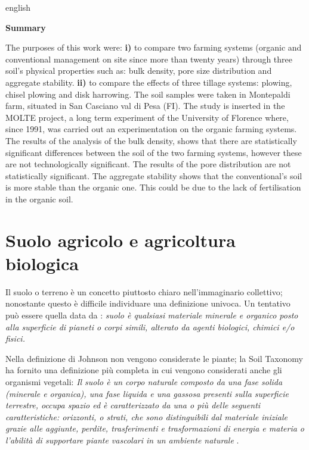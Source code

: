 \documentclass[11pt, a4paper, openright, titlepage, final, language = italian]{book}
\newenvironment{engabstract}%
{\cleardoublepage\null \vfill\begin{center}%
    \bfseries Summary  \end{center} \footnotesize}%
{\vfill\null}
\begin{document}
\begin{otherlanguage*}{english}
\begin{engabstract}
  The purposes of this work were: \textbf{i)} to compare two farming
  systems (organic and conventional management on site since more than
  twenty years) through three soil's physical properties such as: bulk
  density, pore size distribution and aggregate stability.
  \textbf{ii)} to compare the effects of three tillage systems:
  plowing, chisel plowing and disk harrowing. The soil samples were
  taken in Montepaldi farm, situated in San Casciano val di Pesa
  (FI). The study is inserted in the MOLTE project, a long term
  experiment of the University of Florence where, since 1991, was
  carried out an experimentation on the organic farming systems.
  The results of the analysis of the bulk density, shows that there are
  statistically significant differences between the soil of the two
  farming systems, however these are not technologically significant. The
  results of the pore distribution are not statistically
  significant. The aggregate stability shows that the conventional's
  soil is more stable than the organic one. This could be due to the
  lack of fertilisation in the organic soil.
\end{engabstract}
\end{otherlanguage*}


\tableofcontents
\newpage
\fancyhead[RO,LE]{}
\fancyfoot{} %
\fancyfoot[C]{\today\  \currenttime}
\fancyfoot[LE,RO]{\thepage}


\chapter{Suolo agricolo e agricoltura biologica}
Il suolo o terreno \`e un concetto piuttosto chiaro nell'immaginario
collettivo; nonostante questo \`e difficile individuare una
definizione univoca. Un tentativo pu\`o essere quella data da
\citet{JOHNSON19986}: \textit{suolo è qualsiasi materiale minerale e
  organico posto alla superficie di pianeti o corpi simili, alterato
  da agenti biologici, chimici e/o fisici.} 

Nella definizione di Johnson non vengono considerate le piante; la
Soil Taxonomy ha fornito una definizione pi\`u completa in cui vengono
considerati anche gli organismi vegetali: \textit{Il suolo \`e un
  corpo naturale composto da una fase solida (minerale e organica),
  una fase liquida e una gassosa presenti sulla superficie terrestre,
  occupa spazio ed \`e caratterizzato da una o pi\`u delle seguenti
  caratteristiche: orizzonti, o strati, che sono distinguibili dal
  materiale iniziale grazie alle aggiunte, perdite, trasferimenti e
  trasformazioni di energia e materia o l'abilit\`a di supportare
  piante vascolari in un ambiente naturale} \citep{united1999soil}.
\end{document}
